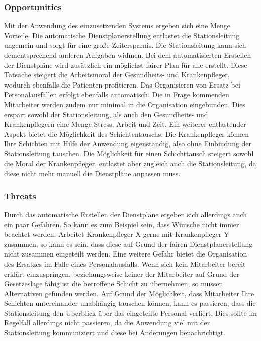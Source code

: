 \documentclass[10pt,a4paper]{article}
\begin{document}
\subsubsection{Opportunities}
Mit der Anwendung des einzusetzenden Systems ergeben sich eine Menge Vorteile. Die automatische Dienstplanerstellung entlastet die Stationsleitung ungemein und sorgt für eine große Zeitersparnis. Die Stationsleitung kann sich dementsprechend anderen Aufgaben widmen. Bei dem automatisierten Erstellen der Dienstpläne wird zusätzlich ein möglichst fairer Plan für alle erstellt. Diese Tatsache steigert die Arbeitsmoral der Gesundheits- und Krankenpfleger, wodurch ebenfalls die Patienten profitieren. 
Das Organisieren von Ersatz bei Personalausfällen erfolgt ebenfalls automatisch. Die in Frage kommenden Mitarbeiter werden zudem nur minimal in die Organisation eingebunden. Dies erspart sowohl der Stationsleitung, als auch den Gesundheits- und Krankenpflegern eine Menge Stress, Arbeit und Zeit. 
Ein weiterer entlastender Aspekt bietet die Möglichkeit des Schichtentauschs. Die Krankenpfleger können Ihre Schichten mit Hilfe der Anwendung eigenständig, also ohne Einbindung der Stationsleitung tauschen. Die Möglichkeit für einen Schichttausch steigert sowohl die Moral der Krankenpfleger, entlastet aber zugleich auch die Stationsleitung, da diese nicht mehr manuell die Dienstpläne anpassen muss. 
\subsubsection{Threats}
Durch das automatische Erstellen der Dienstpläne ergeben sich allerdings auch ein paar Gefahren. So kann es zum Beispiel sein, dass Wünsche nicht immer beachtet werden. Arbeitet Krankenpfleger X gerne mit Krankenpfleger Y zusammen, so kann es sein, dass diese auf Grund der fairen Dienstplanerstellung nicht zusammen eingeteilt werden.
Eine weitere Gefahr bietet die Organisation des Ersatzes im Falle eines Personalausfalls. Wenn sich kein Mitarbeiter bereit erklärt einzuspringen, beziehungsweise keiner der Mitarbeiter auf Grund der Gesetzeslage fähig ist die betroffene Schicht zu übernehmen, so müssen Alternativen gefunden werden.
Auf Grund der Möglichkeit, dass Mitarbeiter Ihre Schichten untereinander unabhängig tauschen können, kann es passieren, dass die Stationsleitung den Überblick über das eingeteilte Personal verliert. Dies sollte im Regelfall allerdings nicht passieren, da die Anwendung viel mit der Stationsleitung kommuniziert und diese bei Änderungen benachrichtigt.
\end{document}
